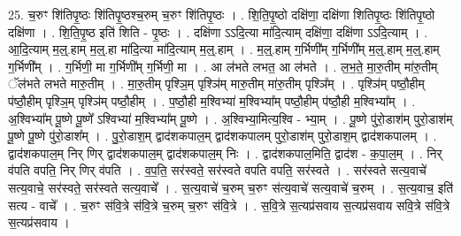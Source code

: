 \documentclass[17pt]{extarticle}
\begin{document}
25. च॒रुꣳ शि॑तिपृ॒ष्ठः शि॑तिपृ॒ष्ठश्च॒रुम् च॒रुꣳ शि॑तिपृ॒ष्ठः । . शि॒ति॒पृ॒ष्ठो दक्षि॑णा॒ दक्षि॑णा शितिपृ॒ष्ठः शि॑तिपृ॒ष्ठो दक्षि॑णा । . शि॒ति॒पृ॒ष्ठ इति॑ शिति - पृ॒ष्ठः । . दक्षि॑णा ऽऽदि॒त्या मा॑दि॒त्याम् दक्षि॑णा॒ दक्षि॑णा ऽऽदि॒त्याम् । . आ॒दि॒त्याम् म॒ल्॒.हाम् म॒ल्॒.हा मा॑दि॒त्या मा॑दि॒त्याम् म॒ल्॒.हाम् । . म॒ल्॒.हाम् ग॒र्भिणी᳚म् ग॒र्भिणी᳚म् म॒ल्॒.हाम् म॒ल्॒.हाम् ग॒र्भिणी᳚म् । . ग॒र्भिणी॒ मा ग॒र्भिणी᳚म् ग॒र्भिणी॒ मा । . आ ल॑भते लभत॒ आ ल॑भते । . ल॒भ॒ते॒ मा॒रु॒तीम् मा॑रु॒तीम् ॅल॑भते लभते मारु॒तीम् । . मा॒रु॒तीम् पृश्ञि॒म् पृश्ञि॑म् मारु॒तीम् मा॑रु॒तीम् पृश्ञि᳚म् । . पृश्ञि॑म् पष्ठौ॒हीम् प॑ष्ठौ॒हीम् पृश्ञि॒म् पृश्ञि॑म् पष्ठौ॒हीम् । . प॒ष्ठौ॒ही म॒श्विभ्या॑ म॒श्विभ्या᳚म् पष्ठौ॒हीम् प॑ष्ठौ॒ही म॒श्विभ्या᳚म् । . अ॒श्विभ्या᳚म् पू॒ष्णे पू॒ष्णे᳚ ऽश्विभ्या॑ म॒श्विभ्या᳚म् पू॒ष्णे । . अ॒श्विभ्या॒मित्य॒श्वि - भ्या॒म् । . पू॒ष्णे पु॑रो॒डाश॑म् पुरो॒डाश॑म् पू॒ष्णे पू॒ष्णे पु॑रो॒डाश᳚म् । . पु॒रो॒डाश॒म् द्वाद॑शकपाल॒म् द्वाद॑शकपालम् पुरो॒डाश॑म् पुरो॒डाश॒म् द्वाद॑शकपालम् । . द्वाद॑शकपाल॒म् निर् णिर् द्वाद॑शकपाल॒म् द्वाद॑शकपाल॒म् निः । . द्वाद॑शकपाल॒मिति॒ द्वाद॑श - क॒पा॒ल॒म् । . निर् व॑पति वपति॒ निर् णिर् व॑पति । . व॒प॒ति॒ सर॑स्वते॒ सर॑स्वते वपति वपति॒ सर॑स्वते । . सर॑स्वते सत्य॒वाचे॑ सत्य॒वाचे॒ सर॑स्वते॒ सर॑स्वते सत्य॒वाचे᳚ । . स॒त्य॒वाचे॑ च॒रुम् च॒रुꣳ स॑त्य॒वाचे॑ सत्य॒वाचे॑ च॒रुम् । . स॒त्य॒वाच॒ इति॑ सत्य - वाचे᳚ । . च॒रुꣳ स॑वि॒त्रे स॑वि॒त्रे च॒रुम् च॒रुꣳ स॑वि॒त्रे । . स॒वि॒त्रे स॒त्यप्र॑सवाय स॒त्यप्र॑सवाय सवि॒त्रे स॑वि॒त्रे स॒त्यप्र॑सवाय । \newline
\end{document}
